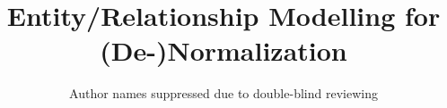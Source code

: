 \documentclass[sigconf]{acmart}
\begin{document}
\title{Entity/Re\-lation\-ship Modelling for (De-)Normalization}








\author{Author names suppressed due to double-blind reviewing}

\end{document}
